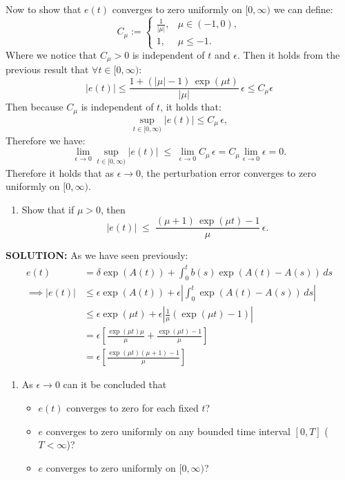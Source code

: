 \documentclass[]{article}
\begin{document}
\begin{enumerate}
\noindent Now to show that $e(t)$ converges to zero uniformly on $[0,\infty)$ we can define:
\[
C_{\mu} :=
\begin{cases}
\frac{1}{|\mu|}, & \mu\in(-1,0),\\[4pt]
1, & \mu\leq -1.
\end{cases}
\]
\noindent Where we notice that $C_{\mu}>0$ is independent of $t$ and $\epsilon$. Then it holds from the previous result that $\forall t \in [0,\infty)$:
\[
|e(t)| \leq \frac{1+(|\mu|-1)\,\exp({\mu t})}{|\mu|}\,\epsilon   \leq C_{\mu}\epsilon
\]
\noindent Then because $C_{\mu}$ is independent of $t$, it holds that:
\[
\sup_{t\in[0,\infty)} |e(t)|\leq C_{\mu}\,\epsilon,
\]
\noindent Therefore we have:
\[
\lim_{\epsilon\to 0}\sup_{t\in[0,\infty)} |e(t)|
\;\leq\; \lim_{\epsilon\to 0} C_{\mu}\,\epsilon =C_{\mu} \lim_{\epsilon\to 0}\epsilon  
= 0.
\]
\noindent Therefore it holds that as $\epsilon\to 0$, the perturbation error converges to zero uniformly on $[0,\infty)$.

\begin{enumerate}
\item[(b)] Show that if $\mu>0$, then
\[
|e(t)| \;\le\; \frac{(\mu+1)\,\exp(\mu t)-1}{\mu}\,\epsilon. \tag{6}
\]
\end{enumerate}

\noindent\textbf{SOLUTION:}\newline
\noindent As we have seen previously:
\begin{align*}
 e(t) &= \delta\exp(A(t)) +\int_0^t b(s)\exp(A(t)-A(s))\,ds\\
\implies |e(t)| &\leq \epsilon \exp(A(t)) + \epsilon \left|\int_0^t\exp(A(t)-A(s))\,ds\right|\\
& \leq \epsilon \exp(\mu t) + \epsilon \left|\frac{1}{\mu}\left(\exp(\mu t)-1\right)\right|\\
&= \epsilon\left[\frac{\exp(\mu t) \mu}{\mu} +\frac{\exp(\mu t)-1}{\mu}\right]\\
&= \epsilon\left[\frac{\exp(\mu t) \left( \mu +1\right)-1}{\mu}\right]
\end{align*}


\begin{enumerate}
\item[ ] As $\epsilon\to 0$ can it be concluded that
\begin{itemize}
\item $e(t)$ converges to zero for each fixed $t$?
\item $e$ converges to zero uniformly on any bounded time interval $[0,T]$ ($T<\infty$)?
\item $e$ converges to zero uniformly on $[0,\infty)$?
\end{itemize}
\end{enumerate}
\end{enumerate}
\end{document}
